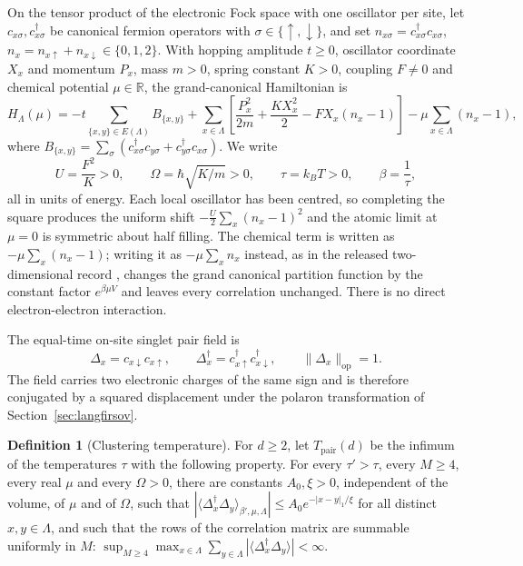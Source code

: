 \documentclass[11pt]{article}
\theoremstyle{plain}
\theoremstyle{definition}
\newtheorem{definition}{Definition}
\newcommand{\Dop}{\Delta}
\begin{document}
On the tensor product of the electronic Fock space with one oscillator per site, let
$c_{x\sigma},c_{x\sigma}^\dagger$ be canonical fermion operators with
$\sigma\in\{\uparrow,\downarrow\}$, and set
$n_{x\sigma}=c_{x\sigma}^\dagger c_{x\sigma}$,
$n_x=n_{x\uparrow}+n_{x\downarrow}\in\{0,1,2\}$. With hopping amplitude $t\ge0$,
oscillator coordinate $X_x$ and momentum $P_x$, mass $m>0$, spring constant $K>0$,
coupling $F\ne0$ and chemical potential $\mu\in\mathbb{R}$, the grand-canonical
Hamiltonian is
\begin{equation}\label{eq:hamiltonian}
 H_\Lambda(\mu)=-t\sum_{\{x,y\}\in E(\Lambda)}B_{\{x,y\}}
 +\sum_{x\in\Lambda}\left[\frac{P_x^2}{2m}+\frac{KX_x^2}{2}-FX_x(n_x-1)\right]
 -\mu\sum_{x\in\Lambda}(n_x-1),
\end{equation}
where
$B_{\{x,y\}}=\sum_{\sigma}(c_{x\sigma}^\dagger c_{y\sigma}+c_{y\sigma}^\dagger c_{x\sigma})$.
We write
\begin{equation}\label{eq:scales}
 U=\frac{F^2}{K}>0,\qquad \Omega=\hbar\sqrt{K/m}>0,\qquad
 \tau=k_BT>0,\qquad \beta=\frac{1}{\tau},
\end{equation}
all in units of energy. Each local oscillator has been centred, so completing the
square produces the uniform shift $-\frac U2\sum_x(n_x-1)^2$ and the atomic limit at
$\mu=0$ is symmetric about half filling. The chemical term is written as
$-\mu\sum_x(n_x-1)$; writing it as $-\mu\sum_x n_x$ instead, as in the released
two-dimensional record \cite{rens2d}, changes the grand canonical partition function
by the constant factor $e^{\beta\mu V}$ and leaves every correlation unchanged. There
is no direct electron-electron interaction.

The equal-time on-site singlet pair field is
\[
 \Dop_x=c_{x\downarrow}c_{x\uparrow},\qquad
 \Dop_x^\dagger=c_{x\uparrow}^\dagger c_{x\downarrow}^\dagger,\qquad
 \|\Dop_x\|_{\mathrm{op}}=1 .
\]
The field carries two electronic charges of the same sign and is therefore
conjugated by a squared displacement under the polaron transformation of
Section~\ref{sec:langfirsov}.

\begin{definition}[Clustering temperature]\label{def:tpair}
For $d\ge2$, let $T_{\mathrm{pair}}(d)$ be the infimum of the temperatures $\tau$
with the following property. For every $\tau'>\tau$, every $M\ge4$, every real
$\mu$ and every $\Omega>0$, there are constants $A_0,\xi>0$, independent of the
volume, of $\mu$ and of $\Omega$, such that
$|\langle\Dop_x^\dagger\Dop_y\rangle_{\beta',\mu,\Lambda}|
 \le A_0e^{-|x-y|_1/\xi}$ for all distinct $x,y\in\Lambda$, and such that the rows
of the correlation matrix are summable uniformly in $M$:
$\sup_{M\ge4}\max_{x\in\Lambda}\sum_{y\in\Lambda}
 |\langle\Dop_x^\dagger\Dop_y\rangle|<\infty$.
\end{definition}
\end{document}
